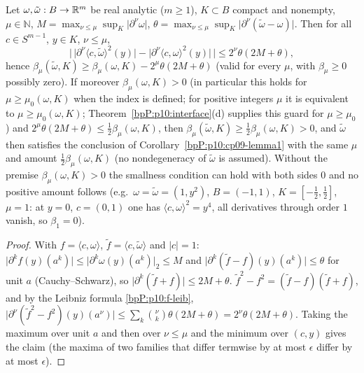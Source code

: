 \begin{lemma}\label{bpP:p10:stability}
Let $\omega,\tilde\omega:B\to\mathbb{R}^m$ be real analytic ($m\ge1$), $K\subset B$ compact and nonempty, $\mu\in\mathbb N$, $M=\max_{\nu\le\mu}\sup_K\lvert\partial^\nu\omega\rvert$, $\theta=\max_{\nu\le\mu}\sup_K\lvert\partial^\nu(\tilde\omega-\omega)\rvert$. Then for all $c\in S^{m-1}$, $y\in K$, $\nu\le\mu$,
\[\big\lvert\,\lvert\partial^\nu\langle c,\tilde\omega\rangle^2(y)\rvert-\lvert\partial^\nu\langle c,\omega\rangle^2(y)\rvert\,\big\rvert\le2^\nu\theta(2M+\theta),\]
hence $\beta_\mu(\tilde\omega,K)\ge\beta_\mu(\omega,K)-2^\mu\theta(2M+\theta)$ (valid for every $\mu$, with $\beta_\mu\ge0$ possibly zero). If moreover $\beta_\mu(\omega,K)>0$ (in particular this holds for $\mu\ge\mu_0(\omega,K)$ when the index is defined; for positive integers $\mu$ it is equivalent to $\mu\ge\mu_0(\omega,K)$; Theorem~\ref{bpP:p10:interface}(d) supplies this guard for $\mu\ge\mu_0$) and $2^\mu\theta(2M+\theta)\le\frac12\beta_\mu(\omega,K)$, then $\beta_\mu(\tilde\omega,K)\ge\frac12\beta_\mu(\omega,K)>0$, and $\tilde\omega$ then satisfies the conclusion of Corollary~\ref{bpP:p10:cp09-lemma1} with the same $\mu$ and amount $\tfrac12\beta_\mu(\omega,K)$ (no nondegeneracy of $\tilde\omega$ is assumed). Without the premise $\beta_\mu(\omega,K)>0$ the smallness condition can hold with both sides $0$ and no positive amount follows (e.g.\ $\omega=\tilde\omega=(1,y^2)$, $B=(-1,1)$, $K=[-\tfrac12,\tfrac12]$, $\mu=1$: at $y=0$, $c=(0,1)$ one has $\langle c,\omega\rangle^2=y^4$, all derivatives through order $1$ vanish, so $\beta_1=0$).
\end{lemma}
\begin{proof}
\label{stepP:p10:st-prod} With $f=\langle c,\omega\rangle$, $\tilde f=\langle c,\tilde\omega\rangle$ and $\lvert c\rvert=1$: $\lvert\partial^kf(y)(a^k)\rvert\le\lvert\partial^k\omega(y)(a^k)\rvert_2\le M$ and $\lvert\partial^k(\tilde f-f)(y)(a^k)\rvert\le\theta$ for unit $a$ (Cauchy--Schwarz), so $\lvert\partial^k(\tilde f+f)\rvert\le2M+\theta$.
\label{stepP:p10:st-diff} $\tilde f^2-f^2=(\tilde f-f)(\tilde f+f)$, and by the Leibniz formula \ref{bpP:p10:f-leib}, $\lvert\partial^\nu(\tilde f^2-f^2)(y)(a^\nu)\rvert\le\sum_k\binom\nu k\theta(2M+\theta)=2^\nu\theta(2M+\theta)$. Taking the maximum over unit $a$ and then over $\nu\le\mu$ and the minimum over $(c,y)$ gives the claim (the maxima of two families that differ termwise by at most $\epsilon$ differ by at most $\epsilon$).
\end{proof}

